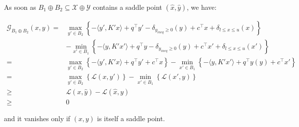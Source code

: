 \documentclass[twoside,12pt,openright]{report}  %
\begin{document}
As soon as \(B_1 \oplus B_2 \subseteq \mathcal{X} \oplus \mathcal{Y}\) contains a saddle point \((\hat{x},\hat{y})\), we have:

\begin{align*}
    \mathcal{G}_{B_1 \oplus B_2}(x,y) 
    =&\max_{y' \in B_2}\left\{ -\langle y',K'x \rangle +q^\top y' - \delta_{y_{ineq} \ge0}(y
    ) + c^\top x + \delta_{l\le x\le u}(x)\right\} \\
    &- \min_{x' \in B_1}\left\{ -\langle y,K'x' \rangle +q^\top y - \delta_{y_{ineq} \ge0}(y)+ c^\top x' + \delta_{l\le x\le u}(x')\right\} \\
    =&\max_{y' \in B_2}\left\{ -\langle y',K'x \rangle +q^\top y' + c^\top x \right\} - \min_{x' \in B_1}\left\{ -\langle y,K'x' \rangle +q^\top y (y)+ c^\top x' \right\} \\
    =&\max_{y' \in B_2}\left\{ \mathcal{L}(x,y') \right\} - \min_{x' \in B_1}\left\{ \mathcal{L}(x',y) \right\} \\
    \ge& \mathcal{L}(x,\hat{y}) - \mathcal{L}(\hat{x},y) \\
    \ge& 0
\end{align*}

and it vanishes only if \((x,y)\) is itself a saddle point.
\end{document}
